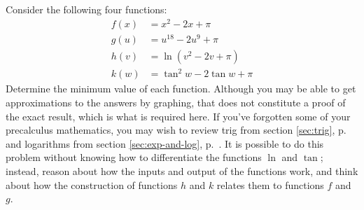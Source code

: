 Consider the following four functions:
\begin{align*}
  f(x) &= x^2-2x+\pi \\
  g(u) &= u^{18}-2u^9+\pi \\
  h(v) &= \ln(v^2-2v+\pi) \\
  k(w) &= \tan^2 w-2\tan w+\pi
\end{align*}
Determine the minimum value of each function.
Although you may be able to get approximations to the answers by
graphing, that does not constitute a proof of the exact result, which
is what is required here.
If you've forgotten some of your precalculus mathematics, you
may wish to review trig from
section \ref{sec:trig}, p.~\pageref{sec:trig} and logarithms
from section \ref{sec:exp-and-log}, p.~\pageref{sec:exp-and-log}.
It is possible
to do this problem without knowing how to differentiate the functions
$\ln$ and $\tan$; instead, reason about how the inputs and output of
the functions work, and think about how the construction of functions $h$ and $k$
relates them to functions $f$ and $g$.\answercheck

